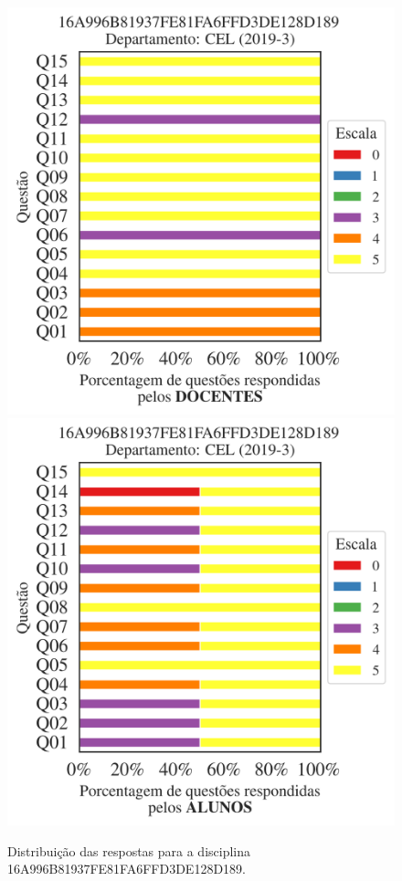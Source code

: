 \documentclass[a4paper,10pt]{article}
\begin{document}
\begin{figure}[h]
\centering
\includegraphics[width=0.485\linewidth]{analise_disciplina_departamento_CEL_16A996B81937FE81FA6FFD3DE128D189_docentes.png}
\includegraphics[width=0.485\linewidth]{analise_disciplina_departamento_CEL_16A996B81937FE81FA6FFD3DE128D189_alunos.png}
\caption{\label{fig:analise_geral_departamento}                Distribuição das respostas para a disciplina 16A996B81937FE81FA6FFD3DE128D189. }
\end{figure}
\end{document}
